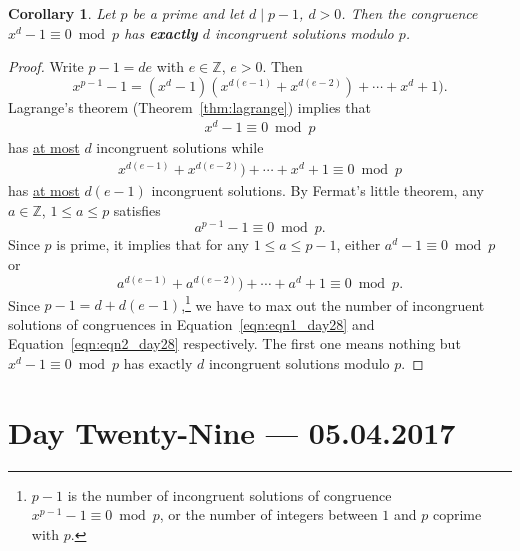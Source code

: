 \documentclass{amsbook}
\theoremstyle{plain}
\newtheorem{corollary}[theorem]{Corollary}
\theoremstyle{definition}
\theoremstyle{remark}
\numberwithin{equation}{chapter}
\numberwithin{figure}{chapter}
\newcommand{\Z}{\mathbb{Z}}
\begin{document}
\begin{corollary}\label{cor:cor_lagrange}
  Let $p$ be a prime and let $d \mid p - 1$, $d > 0$. Then the congruence $x^d - 1 \equiv 0 \bmod p$ has \textbf{exactly} $d$ incongruent solutions modulo $p$.
\end{corollary}
\begin{proof}
  Write $p - 1 = de$ with $e \in \Z$, $e > 0$. Then
  \[
    x^{p-1} - 1 = (x^d - 1)(x^{d(e-1)} + x^{d(e-2)}) + \cdots + x^d + 1).
  \]
  Lagrange's theorem (Theorem~\ref{thm:lagrange}) implies that
  \begin{align}\label{eqn:eqn1_day28}
    x^d - 1 \equiv 0 \bmod p 
  \end{align}
  has \underline{at most} $d$ incongruent solutions while
  \begin{align}\label{eqn:eqn2_day28}
    x^{d(e-1)} + x^{d(e-2)}) + \cdots + x^d + 1 \equiv 0 \bmod p 
  \end{align}
  has \underline{at most} $d(e-1)$ incongruent solutions.
  By Fermat's little theorem, any $a \in \Z$, $1 \leqslant a \leqslant p$ satisfies
  \[
    a^{p-1} - 1 \equiv 0 \bmod p.
  \]
  Since $p$ is prime, it implies that for any $1 \leqslant a \leqslant p - 1$, either $a^d - 1 \equiv 0 \bmod p$ or 
  \[
    a^{d(e-1)} + a^{d(e-2)}) + \cdots + a^d + 1 \equiv 0 \bmod p.
  \]
  Since $p - 1 = d + d(e-1)$,\footnote{$p-1$ is the number of incongruent solutions of congruence $x^{p-1} - 1 \equiv 0 \bmod p$, or the number of integers between $1$ and $p$ coprime with $p$.} we have to max out the number of incongruent solutions of congruences in Equation~\eqref{eqn:eqn1_day28} and Equation~\eqref{eqn:eqn2_day28} respectively. The first one means nothing but $x^d -1 \equiv 0 \bmod p$ has exactly $d$ incongruent solutions modulo $p$.
\end{proof}

\chapter[Lecture Twenty-Nine]{Day Twenty-Nine \hfill {\footnotesize \rm --- 05.04.2017}}\label{chp:prim_rt_exists}
\end{document}
